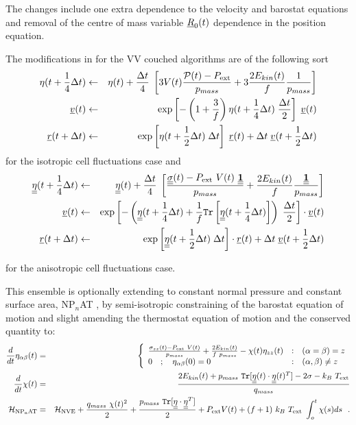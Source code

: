 The changes include one extra dependence to the velocity and
barostat equations and removal of the centre of mass
variable $\mbox{$\underline{R}$}_{0}(t)$ dependence in the position equation.

The modifications in for the VV couched algorithms
are of the following sort
\begin{eqnarray}
\eta (t + {1 \over 4} \Delta t) &\leftarrow& \eta (t) + {\Delta t \over 4} \;
\left[ 3 V(t) \frac{{\cal P}(t) - P_{\rm ext}}{p_{mass}} +
3 \frac{2 E_{kin}(t)}{f} \frac{1}{p_{mass}} \right] \nonumber \\
\mbox{$\underline{v}$}(t) &\leftarrow& \exp \left[ -\left( 1 + \frac{3}{f} \right)
\eta (t + {1 \over 4}\Delta t) \; {\Delta t \over 2} \right] \; \mbox{$\underline{v}$}(t) \\
\mbox{$\underline{r}$}(t + \Delta t) &\leftarrow& \exp \left[ \eta (t + {1 \over 2} \Delta t) \; \Delta t \right] \;
\mbox{$\underline{r}$}(t) + \Delta t \; \mbox{$\underline{v}$}(t + {1 \over 2} \Delta t) \nonumber
\end{eqnarray}
for the isotropic cell fluctuations case and
\begin{eqnarray}
\mbox{$\underline{\underline{\bf \eta}}$}(t + {1 \over 4} \Delta t) &\leftarrow& \mbox{$\underline{\underline{\bf \eta}}$}(t) +
{\Delta t \over 4} \; \left[ \frac{\mbox{$\underline{\underline{\bf \sigma}}$}(t) - P_{\rm ext}~V(t)~\mbox{$\underline{\underline{\bf 1}}$}}{p_{mass}} +
\frac{2 E_{kin}(t)}{f} \frac{\mbox{$\underline{\underline{\bf 1}}$}}{p_{mass}} \right] \nonumber \\
\mbox{$\underline{v}$}(t) &\leftarrow& \exp \left[ -\left( \mbox{$\underline{\underline{\bf \eta}}$}(t + {1 \over 4}\Delta t) +
\frac{1}{f} {\tt Tr}\left[\mbox{$\underline{\underline{\bf \eta}}$}(t + {1 \over 4}\Delta t)\right] \right) \;
{\Delta t \over 2} \right] \cdot \mbox{$\underline{v}$}(t) \\
\mbox{$\underline{r}$}(t + \Delta t) &\leftarrow& \exp \left[ \mbox{$\underline{\underline{\bf \eta}}$} (t + {1 \over 2} \Delta t) \; \Delta t \right] \cdot
\mbox{$\underline{r}$}(t) + \Delta t \; \mbox{$\underline{v}$}(t + {1 \over 2} \Delta t) \nonumber
\end{eqnarray}

for the anisotropic cell fluctuations case.

This ensemble is optionally extending to constant normal pressure
and constant surface area, NP$_{n}$AT \cite{ikeguchi-04a}, by semi-isotropic
constraining of the barostat equation of motion and slight amending
the thermostat equation of motion and the conserved quantity to:
\begin{eqnarray}
\frac{d}{dt} \eta_{\alpha\beta}(t) &=& \left\{ \begin{array} {l@{\quad:\quad}l}
\frac{\sigma_{zz}(t) - P_{\rm ext}~V(t)}{p_{mass}} + \frac{2 E_{kin}(t)}{f~p_{mass}} -
\chi(t) \eta_{zz}(t) & (\alpha = \beta) = z \\
0~~~;~~~\eta_{\alpha\beta}(0) = 0 & (\alpha,\beta) \ne z
\end{array} \right. \nonumber \\
\frac{d}{dt} \chi(t) &=& \frac{2 E_{kin}(t) + p_{mass}~{\tt Tr}[\mat{\eta}(t) \cdot
\mat{\eta}(t)^{T}] - 2 \sigma - k_{B}~T_{\rm ext}}{q_{mass}} \\
{\cal H}_{\rm NP_{n}AT} &=& {\cal H}_{\rm NVE} + {q_{mass}~\chi (t)^{2} \over 2} +
{p_{mass}~{\tt Tr}[\mat{\eta} \cdot \mat{\eta}^{T}] \over 2} + P_{\rm ext} V(t) +
(f+1)~k_{B}~T_{\rm ext}~\int_o^t \chi (s) ds~~. \nonumber
\end{eqnarray}

